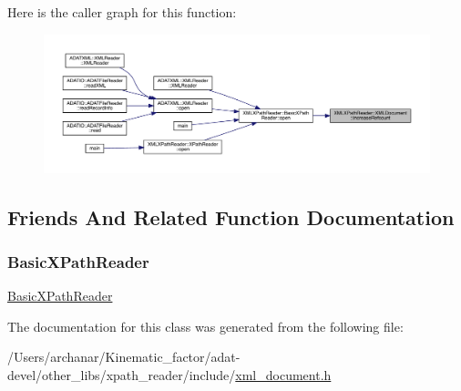 Here is the caller graph for this function\+:
\nopagebreak
\begin{figure}[H]
\begin{center}
\leavevmode
\includegraphics[width=350pt]{d5/dfd/classXMLXPathReader_1_1XMLDocument_ac39670aea17809a726dc6a2cc91c9710_icgraph}
\end{center}
\end{figure}


\subsection{Friends And Related Function Documentation}
\mbox{\label{classXMLXPathReader_1_1XMLDocument_aab456070fa37ace014ac68d8cfd00c68}} 
\subsubsection{\texorpdfstring{BasicXPathReader}{BasicXPathReader}}
{\footnotesize\ttfamily \mbox{\hyperlink{classXMLXPathReader_1_1BasicXPathReader}{Basic\+X\+Path\+Reader}}\hspace{0.3cm}{\ttfamily [friend]}}



The documentation for this class was generated from the following file\+:\begin{DoxyCompactItemize}
\item 
/\+Users/archanar/\+Kinematic\+\_\+factor/adat-\/devel/other\+\_\+libs/xpath\+\_\+reader/include/\mbox{\hyperlink{adat-devel_2other__libs_2xpath__reader_2include_2xml__document_8h}{xml\+\_\+document.\+h}}\end{DoxyCompactItemize}
